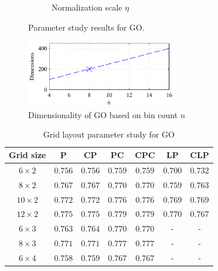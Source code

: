 \documentclass[thesis.tex]{subfiles}
\begin{document}
\begin{figure}[p]
{\begin{subfigure}[t]{0.593\textwidth}
		\caption{Normalization scale $\eta$}
		\label{fig:dtuParametersSi_normSigma}
		\vspace{2mm}
	\end{subfigure}}
	\caption{Parameter study results for GO.}
	\label{fig:dtuParametersGoAuc}
	\vspace{1cm}
	\includegraphics[width=0.593\textwidth]{img/dtuParametersSi_binCountDims.pdf}
	\caption{Dimensionality of GO based on bin count $n$}
	\label{fig:dtuParametersSiDims}
\end{figure}
%
%
\begin{table}[tb]
\centering
\begin{tabular}{ c c c c c c c }
\toprule
Grid size & P & CP & PC & CPC & LP & CLP \\ \midrule
$6 \times 2$ & $0.756$ & $0.756$ & $0.759$ & $0.759$ & $0.700$ & $0.732$ \\ 
$8 \times 2$ & $0.767$ & $0.767$ & $0.770$ & $0.770$ & $0.759$ & $0.763$ \\ 
$10 \times 2$ & $0.772$ & $0.772$ & $0.776$ & $0.776$ & $0.769$ & $0.769$ \\ 
$12 \times 2$ & $0.775$ & $0.775$ & $\mathbf{0.779}$ & $0.779$ & $0.770$ & $0.767$ \\ 
$6 \times 3$ & $0.763$ & $0.764$ & $0.770$ & $0.770$ & - & - \\ 
$8 \times 3$ & $0.771$ & $0.771$ & $0.777$ & $0.777$ & - & - \\ 
$6 \times 4$ & $0.758$ & $0.759$ & $0.767$ & $0.767$ & - & - \\ 
\bottomrule
\end{tabular}
\caption{Grid layout parameter study for GO}
\label{tbl:dtuLayoutParametersGo}
\end{table}
\end{document}
